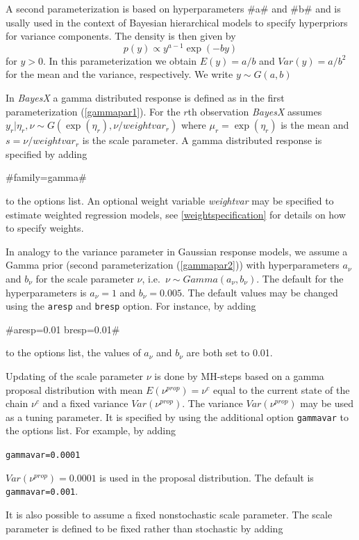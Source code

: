 A second parameterization is based on hyperparameters #a# and #b#
and is usally used in the context of Bayesian hierarchical models
to specify hyperpriors for variance components. The density is
then given by
\begin{equation}
\label{gammapar2} p(y) \propto y^{a-1}\exp(-b y)
\end{equation}
for $y>0$. In this parameterization we obtain $E(y) = a/b$ and
$Var(y) = a/b^2$ for the mean and the variance, respectively. We
write $y \sim G(a,b)$

In {\em BayesX} a gamma distributed response is defined as in the
first parameterization (\ref{gammapar1}). For the $r$th
observation {\em BayesX} assumes  $y_r | \eta_r,\nu \sim
G(\exp(\eta_r),\nu/weightvar_r)$ where $\mu_r = \exp(\eta_r)$ is
the mean and $s=\nu/weightvar_r$ is the scale parameter. A gamma
distributed response is specified by adding

#family=gamma#

to the options list. An optional weight variable {\em weightvar}
may be specified to estimate weighted regression models, see
\autoref{weightspecification} for details on how to specify
weights.

In analogy to the variance parameter in Gaussian response models,
we assume a Gamma prior (second parameterization
(\ref{gammapar2})) with hyperparameters $a_{\nu}$ and $b_{\nu}$
for the scale parameter $\nu$, i.e.~$\nu \sim
Gamma(a_{\nu},b_{\nu})$. The default for the hyperparameters is
$a_{\nu}=1$ and $b_{\nu}=0.005$. The default values may be changed
using the {\tt aresp} and {\tt bresp} option. For instance, by
adding

#aresp=0.01  bresp=0.01#

to the options list, the values of $a_{\nu}$ and $b_{\nu}$ are
both set to 0.01.

Updating of the scale parameter $\nu$ is done by MH-steps based on
a gamma proposal distribution with mean $E(\nu^{prop}) = \nu^{c}$
equal to the current state of the chain $\nu^c$ and a fixed
variance $Var(\nu^{prop})$. The variance $Var(\nu^{prop})$ may be
used as a tuning parameter. It is specified by using the
additional option {\tt gammavar} to the options list. For example,
by adding

{\tt gammavar=0.0001}

$Var(\nu^{prop}) = 0.0001$ is used in the proposal distribution.
The default is {\tt gammavar=0.001}.

It is also possible to assume a fixed nonstochastic scale
parameter. The scale parameter is defined to be fixed rather than
stochastic by adding

